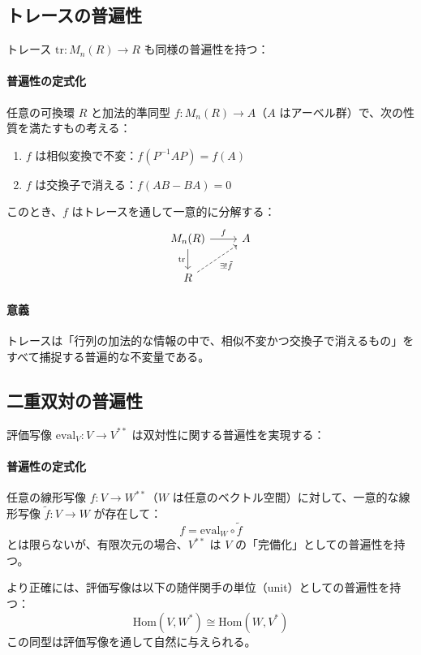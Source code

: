 \documentclass[uplatex,a4j,12pt,dvipdfmx]{jsarticle}
\begin{document}
\subsection{トレースの普遍性}

トレース $\text{tr}: M_n(R) \to R$ も同様の普遍性を持つ：

\paragraph{普遍性の定式化}
任意の可換環 $R$ と加法的準同型 $f: M_n(R) \to A$（$A$ はアーベル群）で、次の性質を満たすもの考える：
\begin{enumerate}
	\item $f$ は相似変換で不変：$f(P^{-1}AP) = f(A)$
	\item $f$ は交換子で消える：$f(AB - BA) = 0$
\end{enumerate}

このとき、$f$ はトレースを通して一意的に分解する：
\[
	\begin{tikzcd}
		M_n(R) \arrow[r, "f"] \arrow[d, "\text{tr}"'] & A \\
		R \arrow[ru, dashed, "\exists! \tilde{f}"'] &
	\end{tikzcd}
\]

\paragraph{意義}
トレースは「行列の加法的な情報の中で、相似不変かつ交換子で消えるもの」をすべて捕捉する普遍的な不変量である。

\subsection{二重双対の普遍性}

評価写像 $\mathrm{eval}_V: V \to V^{**}$ は双対性に関する普遍性を実現する：

\paragraph{普遍性の定式化}
任意の線形写像 $f: V \to W^{**}$（$W$ は任意のベクトル空間）に対して、一意的な線形写像 $\tilde{f}: V \to W$ が存在して：
\[
	f = \mathrm{eval}_W \circ \tilde{f}
\]
とは限らないが、有限次元の場合、$V^{**}$ は $V$ の「完備化」としての普遍性を持つ。

より正確には、評価写像は以下の随伴関手の単位（unit）としての普遍性を持つ：
\[
	\mathrm{Hom}(V, W^*) \cong \mathrm{Hom}(W, V^*)
\]
この同型は評価写像を通して自然に与えられる。
\end{document}
